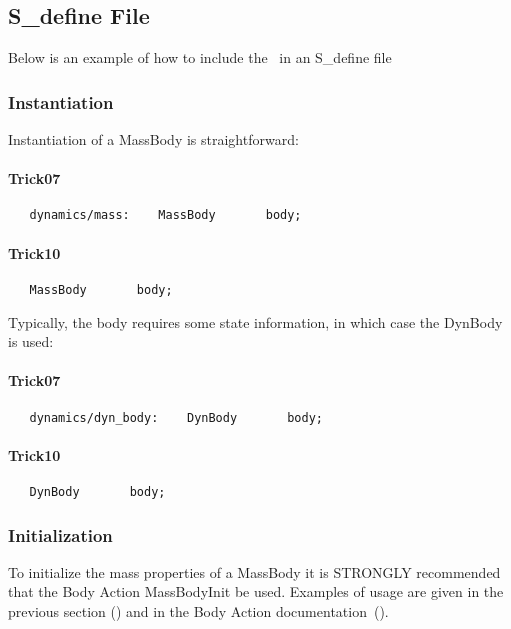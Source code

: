 \subsection{S\_define File}
Below is an example of how to include the \ModelDesc\ in an S\_define file
\subsubsection{Instantiation}

Instantiation of a MassBody is straightforward:

\paragraph{Trick07}
\begin{verbatim}
   dynamics/mass:    MassBody       body;
\end{verbatim}

\paragraph{Trick10}
\begin{verbatim}
   MassBody       body;
\end{verbatim}

Typically, the body requires some state information, in which case the
DynBody is used:

\paragraph{Trick07}
\begin{verbatim}
   dynamics/dyn_body:    DynBody       body;
\end{verbatim}
\paragraph{Trick10}
\begin{verbatim}
   DynBody       body;
\end{verbatim}


\subsubsection{Initialization}
To initialize the mass properties of a MassBody it is STRONGLY recommended
that the Body Action MassBodyInit be used.  Examples of usage are given in the
previous section () and in the Body Action documentation~(\cite{dynenv:BODYACTION}).

